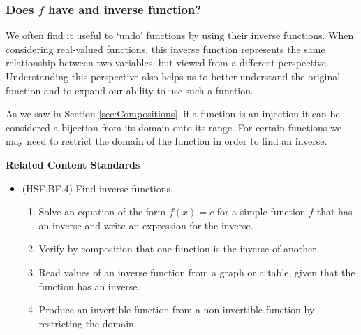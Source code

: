\documentclass[
]{book}
\providecommand{\tightlist}{%
  \setlength{\itemsep}{0pt}\setlength{\parskip}{0pt}}
\newenvironment{standards}{}{}
\theoremstyle{definition}
\theoremstyle{definition}
\theoremstyle{definition}
\theoremstyle{definition}
\theoremstyle{remark}
\begin{document}
\hypertarget{does-f-have-and-inverse-function}{%
\subsubsection*{\texorpdfstring{Does \(f\) have and inverse function?}{Does f have and inverse function?}}\label{does-f-have-and-inverse-function}}

We often find it useful to `undo' functions by using their inverse functions. When considering real-valued functions, this inverse function represents the same relationship between two variables, but viewed from a different perspective. Understanding this perspective also helps us to better understand the original function and to expand our ability to use such a function.

As we saw in Section \ref{sec:Compositions}, if a function is an injection it can be considered a bijection from its domain onto its range. For certain functions we may need to restrict the domain of the function in order to find an inverse.

\begin{standards}

\begin{center}
\textbf{Related Content Standards}

\end{center}

\begin{itemize}
\tightlist
\item
  (HSF.BF.4) Find inverse functions.

  \begin{enumerate}
  \def\labelenumi{\alph{enumi}.}
  \tightlist
  \item
    Solve an equation of the form \(f(x) = c\) for a simple function \(f\) that has an inverse and write an expression for the inverse.
  \item
    Verify by composition that one function is the inverse of another.
  \item
    Read values of an inverse function from a graph or a table, given that the function has an inverse.
  \item
    Produce an invertible function from a non-invertible function by restricting the domain.
  \end{enumerate}
\end{itemize}

\end{standards}
\end{document}
